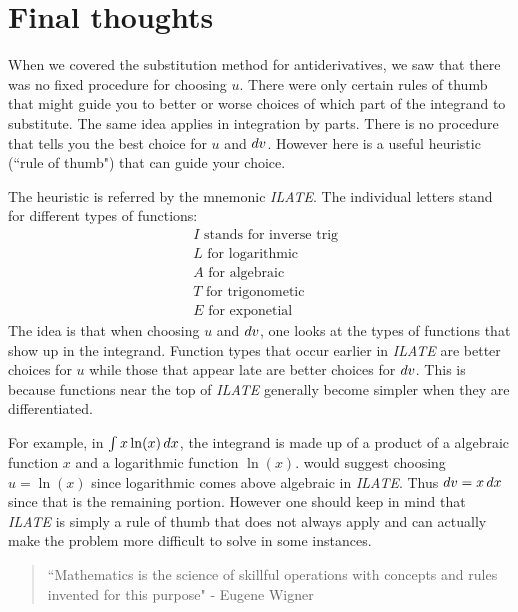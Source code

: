 \documentclass[noauthor]{ximera}
\begin{document}

\section{Final thoughts}
When we covered the substitution method for antiderivatives, we saw that there was no fixed procedure for choosing $u$. There were only certain rules of thumb that might guide you to better or worse choices of which part of the integrand to substitute. The same idea applies in integration by parts. There is no procedure that tells you the best choice for $u$ and $\mathop{}\!d v$. However here is a useful heuristic (``rule of thumb") that can guide your choice. 

The heuristic is referred by the mnemonic \textit{ILATE}.  The individual letters stand for different types of functions: 
\begin{align}
&I \text{  stands for inverse trig} \\ 
&L \text{  for logarithmic} \\
&A \text{  for algebraic} \\
&T \text{  for trigonometic} \\
&E \text{  for exponetial}
\end{align}
The idea is that when choosing $u$ and $\mathop{}\!d v$, one looks at the types of functions that show up in the integrand. Function types that occur earlier in \textit{ILATE} are better choices for $u$ while those that appear late are better choices for $\mathop{}\!d v$. This is because functions near the top of  \textit{ILATE} generally become simpler when they are differentiated. 

For example, in $\int x \ln(x) \mathop{}\!d x$, the integrand is made up of a product of a algebraic function $x$ and a logarithmic function $\ln(x)$.    would suggest choosing $u=\ln(x)$ since logarithmic comes above algebraic in \textit{ILATE}. Thus $\mathop{}\!d v=x \mathop{}\!d x$ since that is the remaining portion. However one should keep in mind that \textit{ILATE} is simply a rule of thumb that does not always apply and can actually make the problem more difficult to solve in some instances. 

\begin{quote}
``Mathematics is the science of skillful operations with concepts and rules invented for this purpose" - Eugene Wigner
\end{quote}
\end{document}
